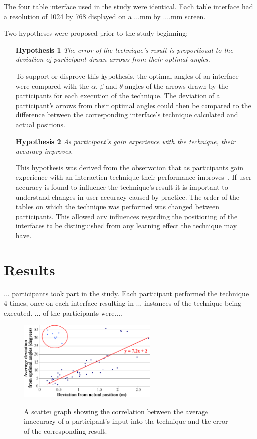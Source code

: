 \documentclass{bmcart}
\begin{document}
The four table interface used in the study were identical.
Each table interface had a resolution of 1024 by 768 displayed on a ...mm by ....mm screen.

Two hypotheses were proposed prior to the study beginning:

\begin{itemize}
\item[\textbf{Hypothesis 1}] \textit{The error of the technique's result is proportional to the deviation of participant drawn arrows from their optimal angles.}

To support or disprove this hypothesis, the optimal angles of an interface were compared with the $\alpha$, $\beta$ and $\theta$ angles of the arrows drawn by the participants for each execution of the technique.
The deviation of a participant's arrows from their optimal angles could then be compared to the difference between the corresponding interface's technique calculated and actual positions.

\item[\textbf{Hypothesis 2}] \textit{As participant's gain experience with the technique, their accuracy improves.}

This hypothesis was derived from the observation that as participants gain experience with an interaction technique their performance improves~\cite{Constantine1999}.
If user accuracy is found to influence the technique's result it is important to understand changes in user accuracy caused by practice.
The order of the tables on which the technique was performed was changed between participants.
This allowed any influences regarding the positioning of the interfaces to be distinguished from any learning effect the technique may have.
\end{itemize}


\section*{Results}\label{sec:results}  

... participants took part in the study.
Each participant performed the technique 4 times, once on each interface resulting in ... instances of the technique being executed.
... of the participants were....

\begin{figure}[h]
   \centering
   \caption{A scatter graph showing the correlation between the average inaccuracy of a participant's input into the technique and the error of the corresponding result.}
   \includegraphics[width=0.6\textwidth]{figures/angle_deviation_scatter.png}
   \label{fig:scatter}
\end{figure}
\end{document}
